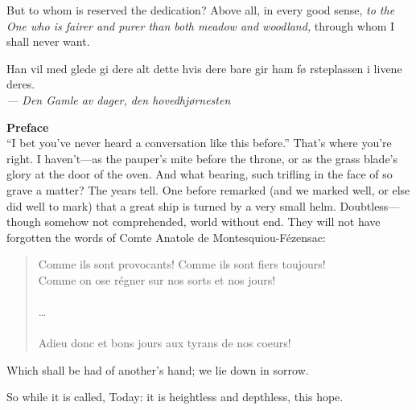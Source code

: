 But to whom is reserved the dedication? Above all, in every good
sense, \emph{to the One who is fairer and purer than both meadow and
  woodland,} through whom I shall never want.

\newpage

\begin{flushright}
\begin{minipage}[]{0.55\linewidth}
    \begin{flushright}
      Han vil med glede gi dere alt dette hvis dere bare gir ham f\o
      rsteplassen i livene deres.  \\{\small \emph{--- Den Gamle av
          dager, den hovedhj\o rnesten} }
    \end{flushright}
\end{minipage}
\end{flushright}

{\Huge \bf Preface} \\

``I bet you've never heard a conversation like this before.'' That's
where you're right. I haven't---as the pauper's mite before the
throne, or as the grass blade's glory at the door of the
oven. And what bearing, such trifling in the face of so grave a
matter?  The years tell.  One before remarked (and we marked well, or
else did well to mark) that a great ship is turned by a very small
helm. Doubtless---though somehow not comprehended, world without
end. They will not have forgotten the words of Comte Anatole de
Montesquiou-F\'{e}zensac:

\begin{quote} 
\begin{spacing}{1.1}
Comme ils sont provocants! Comme ils sont fiers toujours! \\
Comme on ose r\'{e}gner sur nos sorts et nos jours! \\
\\
\dots \\
\\
Adieu donc et bons jours aux tyrans de nos coeurs! \\
\end{spacing}
\end{quote}
Which shall be had of another's hand; we lie down in sorrow.

So while it is called, Today: it is heightless and depthless, this hope.


